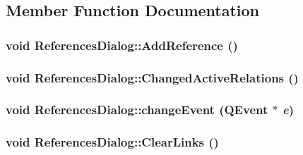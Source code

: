 \subsection{Member Function Documentation}
\hypertarget{class_references_dialog_949cf022393090a9667c32d64b14ef15}{
\subsubsection[{AddReference}]{\setlength{\rightskip}{0pt plus 5cm}void ReferencesDialog::AddReference ()}}
\label{class_references_dialog_949cf022393090a9667c32d64b14ef15}


\hypertarget{class_references_dialog_13951c9836dd020be07f1d733efeefe7}{
\subsubsection[{ChangedActiveRelations}]{\setlength{\rightskip}{0pt plus 5cm}void ReferencesDialog::ChangedActiveRelations ()}}
\label{class_references_dialog_13951c9836dd020be07f1d733efeefe7}


\hypertarget{class_references_dialog_b6cd42a4676ac1a0231eef46e086f509}{
\subsubsection[{changeEvent}]{\setlength{\rightskip}{0pt plus 5cm}void ReferencesDialog::changeEvent (QEvent $\ast$ {\em e})}}
\label{class_references_dialog_b6cd42a4676ac1a0231eef46e086f509}


\hypertarget{class_references_dialog_b00305898821b7a93bdf16ada070e65e}{
\subsubsection[{ClearLinks}]{\setlength{\rightskip}{0pt plus 5cm}void ReferencesDialog::ClearLinks ()}}
\label{class_references_dialog_b00305898821b7a93bdf16ada070e65e}


